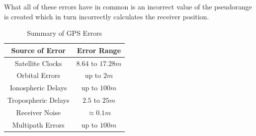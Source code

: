 What all of these errors have in common is an incorrect value of the pseudorange is created which in turn incorrectly calculates the receiver position.


\renewcommand{\arraystretch}{1.5}
\begin{table}
    \begin{center}
        \caption{Summary of GPS Errors}
        \label{tab:GPS Errors}
        \begin{tabular}{ c|c }
            \hline
            \textbf{Source of Error} & \textbf{Error Range} \\
            \hline
            Satellite Clocks & $8.64$ to $17.28m$\\
            Orbital Errors & up to $2m$\\
            Ionospheric Delays & up to $100m$\\
            Tropospheric Delays & $2.5$ to $25m$\\
            Receiver Noise & $\approx 0.1m$\\
            Multipath Errors & up to $100m$\\
            \hline
        \end{tabular}
    \end{center}
\end{table}
\renewcommand{\arraystretch}{1}


